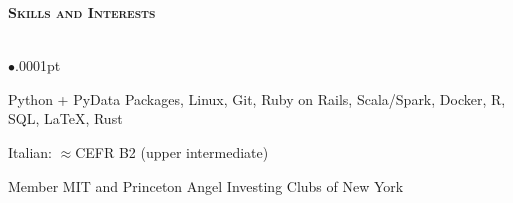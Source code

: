 \documentclass[11pt]{article}
\newcommand{\lineunder}{\vspace*{-8pt} \\ \hspace*{-18pt} \hrulefill \\}
\newcommand{\header}[1]{{\hspace*{-15pt}\vspace*{5pt} \Large \textsc{\textbf{#1}}} \vspace*{-6pt} \lineunder \vspace*{0pt} }
\newcommand{\employer}[4]{
	{\hspace*{-20pt} {\small{\textbf{\textsc{ #1}}}}
  \hfill \small{\emph{#2}}\\ ~\hspace*{-20pt} \small \emph{ #3 \hfill #4}}\\ }
\newenvironment{achievements}{\begin{list}{$\bullet$}{\topsep .0001pt \itemsep -2pt}}{\vspace*{5pt}\end{list} }
\begin{document}




\header{Skills and Interests}
	\vspace{-2pt}
	\begin{achievements}
		\item Python + PyData Packages, Linux, Git, Ruby on Rails, Scala/Spark, Docker, R, SQL, \LaTeX{}, Rust
		\item Italian: $\approx$CEFR B2 (upper intermediate)
		\item Member MIT and Princeton Angel Investing Clubs of New York
	\end{achievements}
\end{document}
